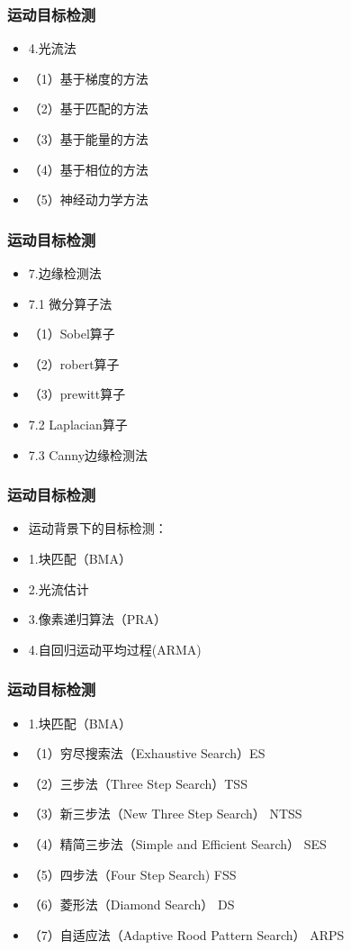\documentclass[notheorems,mathserif,table,compress]{beamer}  %
\begin{document}
\begin{frame}
  \frametitle{运动目标检测}  
  \begin{itemize}
  \item 4.光流法
  \item （1）基于梯度的方法
  \item （2）基于匹配的方法
  \item （3）基于能量的方法 
  \item （4）基于相位的方法
  \item （5）神经动力学方法
  \end{itemize}
\end{frame}

\begin{frame}
  \frametitle{运动目标检测}  
  \begin{itemize}
  \item 7.边缘检测法
  \item 7.1 微分算子法
  \item（1）Sobel算子
  \item（2）robert算子
  \item（3）prewitt算子
  \item 7.2 Laplacian算子
  \item 7.3 Canny边缘检测法
  \end{itemize}
\end{frame}

\begin{frame}
  \frametitle{运动目标检测}  
  \begin{itemize}
  \item 运动背景下的目标检测：
  \item 1.块匹配（BMA）
  \item 2.光流估计
  \item 3.像素递归算法（PRA）
  \item 4.自回归运动平均过程(ARMA)
  \end{itemize}
\end{frame}

\begin{frame}
  \frametitle{运动目标检测}  
  \begin{itemize}
  \item 1.块匹配（BMA）
  \item（1）穷尽搜索法（Exhaustive Search）ES
  \item（2）三步法（Three Step Search）TSS
  \item（3）新三步法（New Three Step Search） NTSS
  \item（4）精简三步法（Simple and Efficient Search） SES
  \item（5）四步法（Four Step Search) FSS
  \item（6）菱形法（Diamond Search） DS
  \item（7）自适应法（Adaptive Rood Pattern Search） ARPS
  \end{itemize}
\end{frame}%
\end{document}
